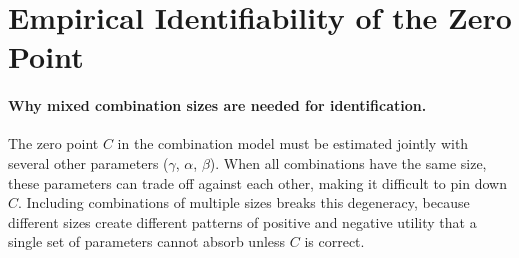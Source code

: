 







\section{Empirical Identifiability of the Zero Point}
\label{app:combination-identifiability}

\paragraph{Why mixed combination sizes are needed for identification.}
The zero point $C$ in the combination model must be estimated jointly with several other parameters ($\gamma$, $\alpha$, $\beta$). When all combinations have the same size, these parameters can trade off against each other, making it difficult to pin down $C$. Including combinations of multiple sizes breaks this degeneracy, because different sizes create different patterns of positive and negative utility that a single set of parameters cannot absorb unless $C$ is correct.

